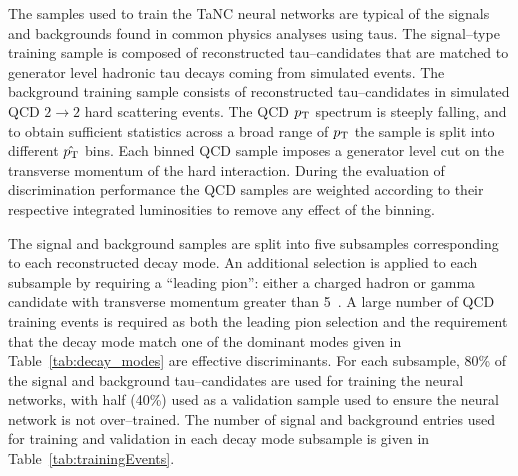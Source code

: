 The samples used to train the TaNC neural networks are typical of the signals
and backgrounds found in common physics analyses using taus.  The signal--type
training sample is composed of reconstructed tau--candidates that are matched to
generator level hadronic tau decays coming from simulated \ZTT events.  The
background training sample consists of reconstructed tau--candidates in
simulated QCD $2\rightarrow2$ hard scattering events.  The QCD $p_{\mathrm{T}}$ spectrum is
steeply falling, and to obtain sufficient statistics across a broad range of
$p_{\mathrm{T}}$ the sample is split into different $\hat {p_{\mathrm{T}}}$ bins.  Each binned QCD
sample imposes a generator level cut on the transverse momentum of the hard
interaction.  During the evaluation of discrimination performance the QCD
samples are weighted according to their respective integrated luminosities to
remove any effect of the binning.

The signal and background samples are split into five subsamples corresponding
to each reconstructed decay mode.  An additional selection is applied to each
subsample by requiring a ``leading pion'': either a charged hadron or gamma
candidate with transverse momentum greater than 5~\GeVc.  A large number of QCD
training events is required as both the leading pion selection and the
requirement that the decay mode match one of the dominant modes given in
Table~\ref{tab:decay_modes} are effective discriminants.  For each subsample,
80\% of the signal and background tau--candidates are used for training the
neural networks, with half (40\%) used as a
validation sample used to ensure the neural network is not over--trained. The
number of signal and background entries used for training and validation in each
decay mode subsample is given in Table~\ref{tab:trainingEvents}.



